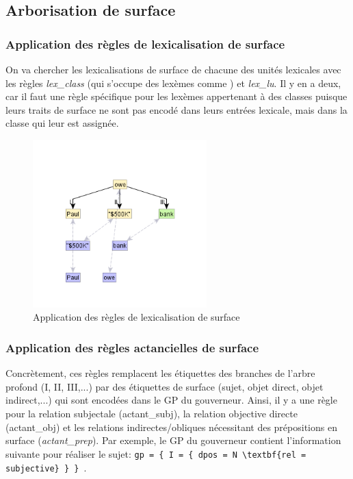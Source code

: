 \subsection{Arborisation de surface}

\subsubsection{Application des règles de lexicalisation de surface}
On va chercher les lexicalisations de surface de chacune des unités lexicales avec les règles \emph{lex\_class} (qui s'occupe des lexèmes comme ) et \emph{lex\_lu}. Il y en a deux, car il faut une règle spécifique pour les lexèmes appertenant à des classes puisque leurs traits de surface ne sont pas encodé dans leurs entrées lexicale, mais dans la classe qui leur est assignée.

\begin{figure}[htb]
	\centering
	\includegraphics[width=0.6\textwidth, trim = {0cm 13mm 0cm 2cm},clip]{ch3/figs/rsyntslexicalisation1.png}
	\caption{Application des règles de lexicalisation de surface}
	\label{fig:lexsurf}
\end{figure}

\subsubsection{Application des règles actancielles de surface}
Concrètement, ces règles remplacent les étiquettes des branches de l'arbre profond (I, II, III,...) par des étiquettes de surface (sujet, objet direct, objet indirect,...) qui sont encodées dans le \ac{GP} du gouverneur. Ainsi, il y a une règle pour la relation subjectale (actant\_subj), la relation objective directe (actant\_obj) et les relations indirectes/obliques nécessitant des prépositions en surface (\emph{actant\_prep}). Par exemple, le \ac{GP} du gouverneur contient l'information suivante pour réaliser le sujet: \lstinline!gp = { I = { dpos = N \textbf{rel = subjective} } } !.

